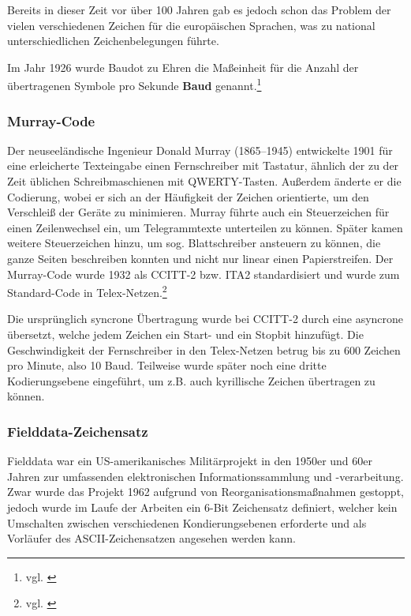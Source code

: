 Bereits in dieser Zeit vor über 100 Jahren gab es jedoch schon das Problem der vielen verschiedenen Zeichen für die europäischen Sprachen, was zu national unterschiedlichen Zeichenbelegungen führte.

Im Jahr 1926 wurde Baudot zu Ehren die Maßeinheit für die Anzahl der übertragenen Symbole pro Sekunde \textbf{Baud} genannt.\footnote{vgl. \cite{BO}}

\subsubsection{Murray-Code}
Der neuseeländische Ingenieur Donald Murray (1865–1945) entwickelte 1901 für eine erleicherte Texteingabe einen Fernschreiber mit Tastatur, ähnlich der zu der Zeit üblichen Schreibmaschienen mit QWERTY-Tasten. Außerdem änderte er die Codierung, wobei er sich an der Häufigkeit der Zeichen orientierte, um den Verschleiß der Geräte zu minimieren. Murray führte auch ein Steuerzeichen für einen Zeilenwechsel ein, um Telegrammtexte unterteilen zu können.
Später kamen weitere Steuerzeichen hinzu, um sog. Blattschreiber ansteuern zu können, die ganze Seiten beschreiben konnten und nicht nur linear einen Papierstreifen.
Der Murray-Code wurde 1932 als CCITT-2 bzw. ITA2 standardisiert und wurde zum Standard-Code in Telex-Netzen.\footnote{vgl. \cite{ITU}}

Die ursprünglich syncrone Übertragung wurde bei CCITT-2 durch eine asyncrone übersetzt, welche jedem Zeichen ein Start- und ein Stopbit hinzufügt.
Die Geschwindigkeit der Fernschreiber in den Telex-Netzen betrug bis zu 600 Zeichen pro Minute, also 10 Baud.
Teilweise wurde später noch eine dritte Kodierungsebene eingeführt, um z.B. auch kyrillische Zeichen übertragen zu können.

\subsubsection{Fielddata-Zeichensatz}
Fielddata war ein US-amerikanisches Militärprojekt in den 1950er und 60er Jahren zur umfassenden elektronischen Informationssammlung und -verarbeitung.
Zwar wurde das Projekt 1962 aufgrund von Reorganisationsmaßnahmen gestoppt, jedoch wurde im Laufe der Arbeiten ein 6-Bit Zeichensatz definiert, welcher kein Umschalten zwischen verschiedenen Kondierungsebenen erforderte und als Vorläufer des ASCII-Zeichensatzen angesehen werden kann.

